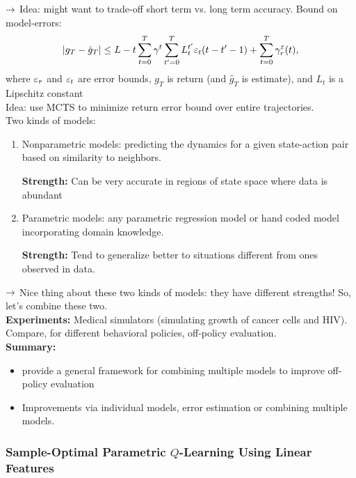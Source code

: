  $\rightarrow$ Idea: might want to trade-off short term vs. long term accuracy. Bound on model-errors:
 \[
 |g_T - \hat{g}_T| \leq L-t \sum_{t=0}^T \gamma^t \sum_{t'=0}^T L_t^{t'} \varepsilon_t (t-t'-1) + \sum_{t=0}^T \gamma^ \varepsilon_r(t),
 \]
where $\varepsilon_r$ and $\varepsilon_t$ are error bounds, $g_T$ is return (and $\hat{g}_T$ is estimate), and $L_t$ is a Lipschitz constant  \\

Idea: use MCTS to minimize return error bound over entire trajectories. \\

Two kinds of models:
\begin{enumerate}
    \item Nonparametric models: predicting the dynamics for a given state-action pair based on similarity to neighbors.
    
    {\bf Strength:}  Can be very accurate in regions of state space where data is abundant
    
    \item Parametric models: any parametric regression model or hand coded model incorporating domain knowledge.
    
    {\bf Strength:} Tend to generalize better to situations different from ones observed in data.
\end{enumerate}

$\rightarrow$ Nice thing about these two kinds of models: they have different strengths! So, let's combine these two.\\

{\bf Experiments:} Medical simulators (simulating growth of cancer cells and HIV). Compare, for different behavioral policies, off-policy evaluation. \\

{\bf Summary:}
\begin{itemize}
    \item provide a general framework for combining multiple models to improve off-policy evaluation
    \item Improvements via individual models, error estimation or combining multiple models.
\end{itemize}

\spacerule


\subsubsection{Sample-Optimal Parametric $Q$-Learning Using Linear Features}

